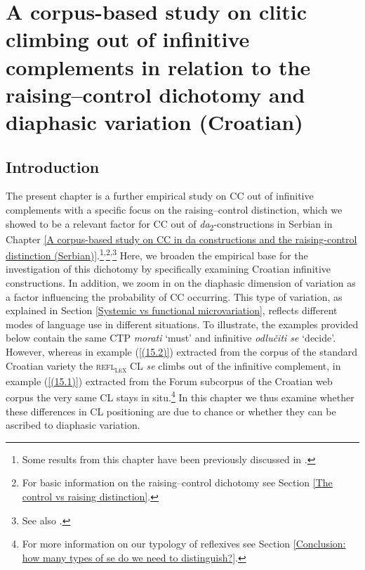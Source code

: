\chapter[A corpus-based study on clitic climbing out of infinitive complements]
        {A corpus-based study on clitic climbing out of infinitive complements in relation to the raising--control dichotomy and diaphasic variation (Croatian)}
\label{A corpus-based study on clitic climbing in infinitive complements in relation to the raising-control dichotomy and diaphasic variation (Croatian)}
\section{Introduction}

The present chapter is a further empirical study on CC out of infinitive complements with a specific focus on the raising--control distinction, which we showed to be a relevant factor for CC out of \textit{da}\textsubscript{2}-constructions in Serbian in Chapter \ref{A corpus-based study on CC in da constructions and the raising-control distinction (Serbian)}.\footnote{Some results from this chapter have been previously discussed in \citet*{KJH19}.}\textsuperscript{,}\footnote{For basic information on the raising--control dichotomy see Section \ref{The control vs raising distinction}.}\textsuperscript{,}\footnote{See also \citet*{JHK17b}.} Here, we broaden the empirical base for the investigation of this dichotomy by specifically examining Croatian infinitive constructions. In addition, we zoom in on the diaphasic dimension of variation as a factor influencing the probability of CC occurring. This type of variation, as explained in Section \ref{Systemic vs functional microvariation}, reflects different modes of language use in different situations. To illustrate, the examples provided below contain the same CTP \textit{morati} ‘must’ and infinitive \textit{odlučiti se} ‘decide’. However, whereas in example (\ref{(15.2)}) extracted from the corpus of the standard Croatian variety the \textsc{refl\textsubscript{lex}} CL \textit{se} climbs out of the infinitive complement, in example (\ref{(15.1)}) extracted from the Forum subcorpus of the Croatian web corpus the very same CL stays in situ.\footnote{For more information on our typology of reflexives see Section \ref{Conclusion: how many types of se do we need to distinguish?}.} In this chapter we thus examine whether these differences in CL positioning are due to chance or whether they can be ascribed to diaphasic variation.

